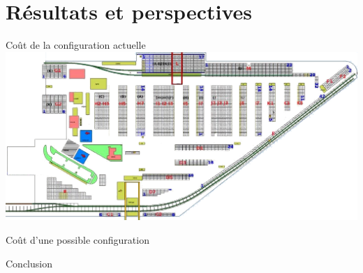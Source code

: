 \section{Résultats et perspectives}

\begin{frame}{Coût de la configuration actuelle}
  \includegraphics[width=\textwidth]{../images/Plan_Terminal.png}
\end{frame}

\begin{frame}{Coût d'une possible configuration}
  
\end{frame}

\begin{frame}{Conclusion}
\end{frame}
